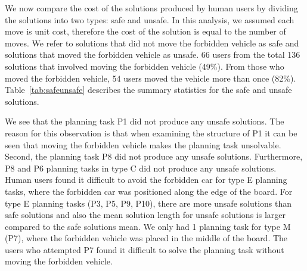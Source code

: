 We now compare the cost of the solutions produced by human users by dividing the solutions into two types: safe and unsafe. 
In this analysis, we assumed each move is unit cost, therefore the cost of the solution is equal to the number of moves.
We refer to solutions that did not move the
forbidden vehicle as safe and solutions that moved the forbidden vehicle as unsafe. 
66 users from the total 136 solutions that involved moving the forbidden vehicle
(49\%). 
From those who moved the forbidden vehicle, 54 users moved the vehicle more than once
(82\%). 
Table~\ref{tab:safeunsafe} describes the summary statistics for the safe and unsafe solutions.

We see that the planning task P1 did not produce any unsafe solutions.
The reason for this observation is that when examining the structure of P1 it can be seen that moving the forbidden vehicle makes the planning task unsolvable. 
Second, the planning task P8 did not produce any unsafe solutions.
Furthermore, P8 and P6 planning tasks in type C did not produce any unsafe solutions. 
Human users found it difficult to avoid the forbidden car for type E planning tasks, where the forbidden car was positioned along the edge of the board.
For type E planning tasks (P3, P5, P9, P10), there are more unsafe solutions than safe solutions and also the mean solution length for unsafe solutions is larger compared to the safe solutions mean. 
We only had 1 planning task for type M (P7), where the forbidden vehicle was placed in the middle of the board. 
The users who attempted P7 found it difficult to solve the planning task without moving the forbidden vehicle. 

